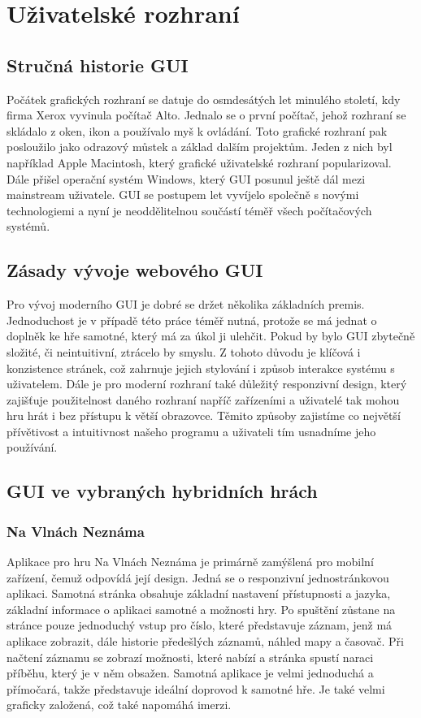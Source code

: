 \chapter{Uživatelské rozhraní}

\section{Stručná historie GUI}
Počátek grafických rozhraní se datuje do osmdesátých let minulého století, kdy firma Xerox vyvinula počítač Alto. Jednalo se o první počítač, jehož rozhraní se skládalo z oken, ikon a používalo myš k ovládání. Toto grafické rozhraní pak posloužilo jako odrazový můstek a základ dalším projektům. Jeden z nich byl například Apple Macintosh, který grafické uživatelské rozhraní popularizoval. Dále přišel operační systém Windows, který GUI posunul ještě dál mezi mainstream uživatele. GUI se postupem let vyvíjelo společně s novými technologiemi a nyní je neoddělitelnou součástí téměř všech počítačových systémů.

\section{Zásady vývoje webového GUI}
Pro vývoj moderního GUI je dobré se držet několika základních premis. Jednoduchost je v případě této práce téměř nutná, protože se má jednat o doplněk ke hře samotné, který má za úkol ji ulehčit. Pokud by bylo GUI zbytečně složité, či neintuitivní, ztrácelo by smyslu. Z tohoto důvodu je klíčová i konzistence stránek, což zahrnuje jejich stylování i způsob interakce systému s uživatelem. Dále je pro moderní rozhraní také důležitý responzivní design, který zajišťuje použitelnost daného rozhraní napříč zařízeními a uživatelé tak mohou hru hrát i bez přístupu k větší obrazovce. Těmito způsoby zajistíme co největší přívětivost a intuitivnost našeho programu a uživateli tím usnadníme jeho používání.

\section{GUI ve vybraných hybridních hrách}

\subsection{Na Vlnách Neznáma}
Aplikace pro hru Na Vlnách Neznáma je primárně zamýšlená pro mobilní zařízení, čemuž odpovídá její design. Jedná se o responzivní jednostránkovou aplikaci. Samotná stránka obsahuje základní nastavení přístupnosti a jazyka, základní informace o aplikaci samotné a možnosti hry. Po spuštění zůstane na stránce pouze jednoduchý vstup pro číslo, které představuje záznam, jenž má aplikace zobrazit, dále historie předešlých záznamů, náhled mapy a časovač. Při načtení záznamu se zobrazí možnosti, které nabízí a stránka spustí naraci příběhu, který je v něm obsažen. Samotná aplikace je velmi jednoduchá a přímočará, takže představuje ideální doprovod k samotné hře. Je také velmi graficky založená, což také napomáhá imerzi.

